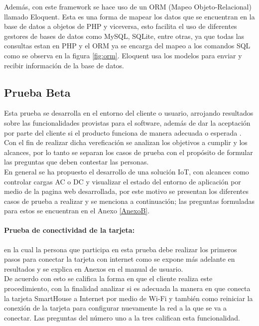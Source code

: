 Además, con este framework se hace uso de un ORM (Mapeo Objeto-Relacional) llamado Eloquent. Esta es una forma de mapear los datos que se encuentran en la base de datos a objetos de PHP y viceversa, esto facilita el uso de diferentes gestores de bases de datos como MySQL, SQLite, entre otras, ya que todas las consultas estan en PHP y el ORM ya se encarga del mapeo a los comandos SQL como se observa en la figura \ref{fig:orm}. Eloquent usa los modelos para enviar y recibir información de la base de datos\cite{Eloq}.\\


\subsection{Prueba Beta}

Esta prueba se desarrolla en el entorno del cliente o usuario, arrojando resultados sobre las funcionalidades provistas para el software, además de dar la aceptación por parte del cliente si el producto funciona de manera adecuada o esperada \cite{PB}. Con el fin de realizar dicha vereficación se analizan los objetivos a cumplir y los alcances, por lo tanto se separan los casos de prueba con el propósito de formular las preguntas que deben contestar las personas.\\

En general se ha propuesto el desarrollo de una solución IoT, con alcances como controlar cargas AC o DC y visualizar el estado del entorno de aplicación por medio de la pagina web desarrollada, por este motivo se presentan los diferentes casos de prueba a realizar y se menciona a continuación; las preguntas formuladas para estos se encuentran en el Anexo \ref{AnexoB}.

\paragraph{Prueba de conectividad de la tarjeta:} en la cual la persona que participa en esta prueba debe realizar los primeros pasos para conectar la tarjeta con internet como se expone más adelante en resultados y se explica en Anexos en el manual de usuario.\\

De acuerdo con esto se califica la forma en que el cliente realiza este procedimiento, con la finalidad analizar si es adecuada la manera en que conecta la tarjeta SmartHouse a Internet por medio de Wi-Fi y también como reiniciar la conexión de la tarjeta para configurar nuevamente la red a la que se va a conectar. Las preguntas del número uno a la tres califican esta funcionalidad.\\

